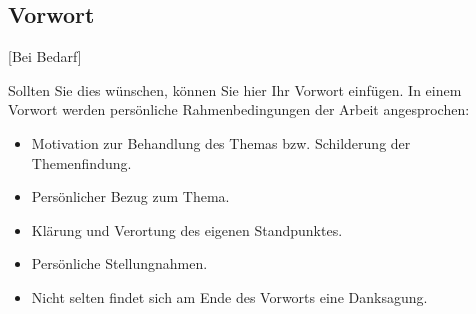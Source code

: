 \documentclass[./\jobname.tex]{subfiles}
\begin{document}
\begin{envLanguage}[ngerman]
\chapter*{Vorwort}
[Bei Bedarf]\par
%
Sollten Sie dies wünschen, können Sie hier Ihr Vorwort einfügen.
In einem Vorwort werden persönliche Rahmenbedingungen der Arbeit angesprochen: 
\begin{itemize}
	\item  Motivation zur Behandlung des Themas bzw. Schilderung der Themenfindung.
	\item Persönlicher Bezug zum Thema.
	\item Klärung und Verortung des eigenen Standpunktes.
	\item Persönliche Stellungnahmen.
	\item Nicht selten findet sich am Ende des Vorworts eine Danksagung.
\end{itemize}
%
\end{envLanguage}
\end{document}
